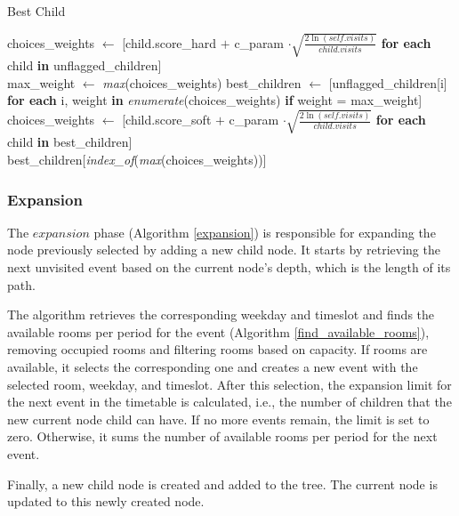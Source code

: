 \begin{algorithm}
\caption{Best Child}\label{best_child}
\begin{algorithmic}[1]
    \State choices\_weights $\gets$ [child.score\_hard $+$ c\_param $\cdot \sqrt{\frac{2\ln(\textit{self.visits})}{child.visits}}$ \textbf{for each} child \textbf{in} unflagged\_children]
    \\
    \State max\_weight $\gets$ \textit{max}(choices\_weights)
    \State best\_children $\gets$ [unflagged\_children[i] \textbf{for each} i, weight \textbf{in} \textit{enumerate}(choices\_weights) \textbf{if} weight = max\_weight]
    \\
    \State choices\_weights $\gets$ [child.score\_soft $+$ c\_param $\cdot \sqrt{\frac{2\ln(\textit{self.visits})}{child.visits}}$ \textbf{for each} child \textbf{in} best\_children]
    \\
    \State \Return best\_children[\textit{index\_of}(\textit{max}(choices\_weights))]
\EndFunction
\end{algorithmic}
\end{algorithm}

\subsubsection{Expansion}

The \(expansion\) phase (Algorithm \ref{expansion}) is responsible for expanding the node previously selected by adding a new child node. It starts by retrieving the next unvisited event based on the current node's depth, which is the length of its path.

The algorithm retrieves the corresponding weekday and timeslot and finds the available rooms per period for the event (Algorithm \ref{find_available_rooms}), removing occupied rooms and filtering rooms based on capacity. If rooms are available, it selects the corresponding one and creates a new event with the selected room, weekday, and timeslot. After this selection, the expansion limit for the next event in the timetable is calculated, i.e., the number of children that the new current node child can have. If no more events remain, the limit is set to zero. Otherwise, it sums the number of available rooms per period for the next event.
 
Finally, a new child node is created and added to the tree. The current node is updated to this newly created node.

